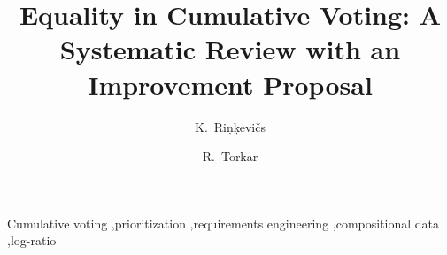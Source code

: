 \begin{frontmatter}
\title{Equality in Cumulative Voting: A Systematic Review with an Improvement Proposal}


\author[aff1]{K.~Ri{\c n}{\c k}evi{\v c}s}
\author[aff1,aff2]{R.~Torkar}
\address[aff1]{Blekinge Institute of Technology, Sweden}
\address[aff2]{Chalmers University of Technology and University of Gothenburg, Sweden}


\begin{abstract}

\end{abstract}

\begin{keyword}
Cumulative voting \sep prioritization \sep requirements engineering \sep compositional data \sep log-ratio
\end{keyword}

\end{frontmatter}
